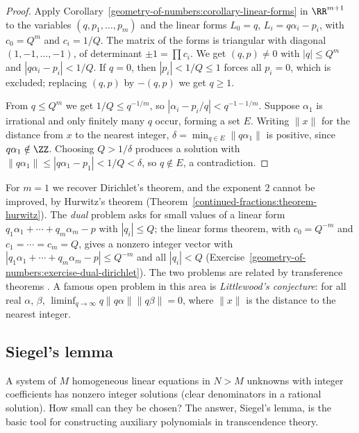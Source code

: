 \begin{proof}
Apply Corollary~\ref{geometry-of-numbers:corollary-linear-forms} in $\RR^{m+1}$ to the variables $(q, p_1, \ldots, p_m)$ and the linear forms $L_0 = q$, $L_i = q\alpha_i - p_i$, with $c_0 = Q^m$ and
$c_i = 1/Q$. The matrix of the forms is triangular with diagonal $(1, -1, \ldots, -1)$, of determinant $\pm1 = \prod c_i$. We get $(q, p) \neq 0$ with $|q| \leq Q^m$ and $|q\alpha_i - p_i| < 1/Q$. If
$q = 0$, then $|p_i| < 1/Q \leq 1$ forces all $p_i = 0$, which is excluded; replacing $(q, p)$ by $-(q, p)$ we get $q \geq 1$.

From $q \leq Q^m$ we get $1/Q \leq q^{-1/m}$, so $|\alpha_i - p_i/q| < q^{-1-1/m}$. Suppose $\alpha_1$ is irrational and only finitely many $q$ occur, forming a set $E$. Writing $\|x\|$ for the
distance from $x$ to the nearest integer, $\delta = \min_{q \in E}\|q\alpha_1\|$ is positive, since $q\alpha_1 \notin \ZZ$. Choosing $Q > 1/\delta$ produces a solution with
$\|q\alpha_1\| \leq |q\alpha_1 - p_1| < 1/Q < \delta$, so $q \notin E$, a contradiction.
\end{proof}

\begin{remark}\label{geometry-of-numbers:remark-simultaneous}
For $m = 1$ we recover Dirichlet's theorem, and the exponent $2$ cannot be improved, by Hurwitz's theorem (Theorem~\ref{continued-fractions:theorem-hurwitz}). The \emph{dual} problem asks for
small values of a linear form $q_1\alpha_1 + \cdots + q_m\alpha_m - p$ with $|q_i| \leq Q$; the linear forms theorem, with $c_0 = Q^{-m}$ and $c_1 = \cdots = c_m = Q$, gives a nonzero integer
vector with $|q_1\alpha_1 + \cdots + q_m\alpha_m - p| \leq Q^{-m}$ and all $|q_i| < Q$ (Exercise~\ref{geometry-of-numbers:exercise-dual-dirichlet}). The two problems are related by
transference theorems \cite{cassels-geometry-numbers}. A famous open problem in this area is \emph{Littlewood's conjecture}: for all real $\alpha$, $\beta$,
$\liminf_{q \to \infty}q\|q\alpha\|\|q\beta\| = 0$, where $\|x\|$ is the distance to the nearest integer.
\end{remark}

\subsection{Siegel's lemma}\label{geometry-of-numbers:subsection-siegel}

A system of $M$ homogeneous linear equations in $N > M$ unknowns with integer coefficients has nonzero integer solutions (clear denominators in a rational solution). How small can they be chosen?
The answer, Siegel's lemma, is the basic tool for constructing auxiliary polynomials in transcendence theory.

